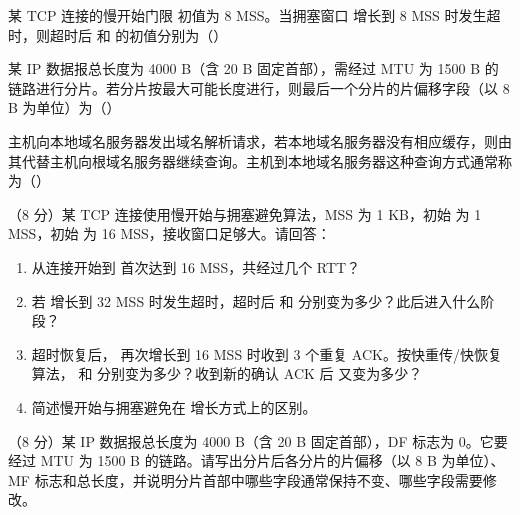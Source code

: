 \documentclass[a4paper,11pt]{article}
\begin{document}
\q 某 TCP 连接的慢开始门限  初值为 8 MSS。当拥塞窗口  增长到 8 MSS 时发生超时，则超时后  和  的初值分别为（\quad）

\q 某 IP 数据报总长度为 4000 B（含 20 B 固定首部），需经过 MTU 为 1500 B 的链路进行分片。若分片按最大可能长度进行，则最后一个分片的片偏移字段（以 8 B 为单位）为（\quad）

\q 主机向本地域名服务器发出域名解析请求，若本地域名服务器没有相应缓存，则由其代替主机向根域名服务器继续查询。主机到本地域名服务器这种查询方式通常称为（\quad）


\q （8 分）某 TCP 连接使用慢开始与拥塞避免算法，MSS 为 1 KB，初始  为 1 MSS，初始  为 16 MSS，接收窗口足够大。请回答：
\begin{enumerate}[label=（\arabic*）, leftmargin=2.4em, itemsep=1pt]
  \item 从连接开始到  首次达到 16 MSS，共经过几个 RTT？
  \item 若  增长到 32 MSS 时发生超时，超时后  和  分别变为多少？此后进入什么阶段？
  \item 超时恢复后， 再次增长到 16 MSS 时收到 3 个重复 ACK。按快重传/快恢复算法， 和  分别变为多少？收到新的确认 ACK 后  又变为多少？
  \item 简述慢开始与拥塞避免在  增长方式上的区别。
\end{enumerate}
\anslines{7cm}

\q （8 分）某 IP 数据报总长度为 4000 B（含 20 B 固定首部），DF 标志为 0。它要经过 MTU 为 1500 B 的链路。请写出分片后各分片的片偏移（以 8 B 为单位）、MF 标志和总长度，并说明分片首部中哪些字段通常保持不变、哪些字段需要修改。
\anslines{6cm}
\end{document}
